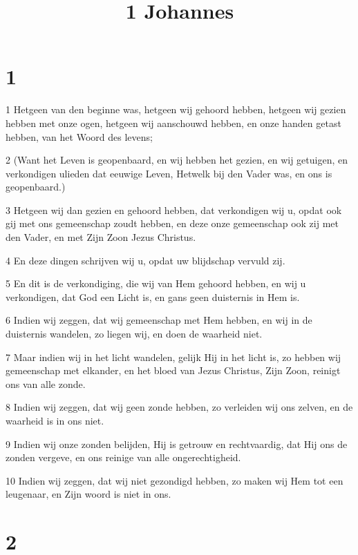 

\title{1 Johannes}



\chapter{1}

\par 1 Hetgeen van den beginne was, hetgeen wij gehoord hebben, hetgeen wij gezien hebben met onze ogen, hetgeen wij aanschouwd hebben, en onze handen getast hebben, van het Woord des levens;
\par 2 (Want het Leven is geopenbaard, en wij hebben het gezien, en wij getuigen, en verkondigen ulieden dat eeuwige Leven, Hetwelk bij den Vader was, en ons is geopenbaard.)
\par 3 Hetgeen wij dan gezien en gehoord hebben, dat verkondigen wij u, opdat ook gij met ons gemeenschap zoudt hebben, en deze onze gemeenschap ook zij met den Vader, en met Zijn Zoon Jezus Christus.
\par 4 En deze dingen schrijven wij u, opdat uw blijdschap vervuld zij.
\par 5 En dit is de verkondiging, die wij van Hem gehoord hebben, en wij u verkondigen, dat God een Licht is, en gans geen duisternis in Hem is.
\par 6 Indien wij zeggen, dat wij gemeenschap met Hem hebben, en wij in de duisternis wandelen, zo liegen wij, en doen de waarheid niet.
\par 7 Maar indien wij in het licht wandelen, gelijk Hij in het licht is, zo hebben wij gemeenschap met elkander, en het bloed van Jezus Christus, Zijn Zoon, reinigt ons van alle zonde.
\par 8 Indien wij zeggen, dat wij geen zonde hebben, zo verleiden wij ons zelven, en de waarheid is in ons niet.
\par 9 Indien wij onze zonden belijden, Hij is getrouw en rechtvaardig, dat Hij ons de zonden vergeve, en ons reinige van alle ongerechtigheid.
\par 10 Indien wij zeggen, dat wij niet gezondigd hebben, zo maken wij Hem tot een leugenaar, en Zijn woord is niet in ons.

\chapter{2}

